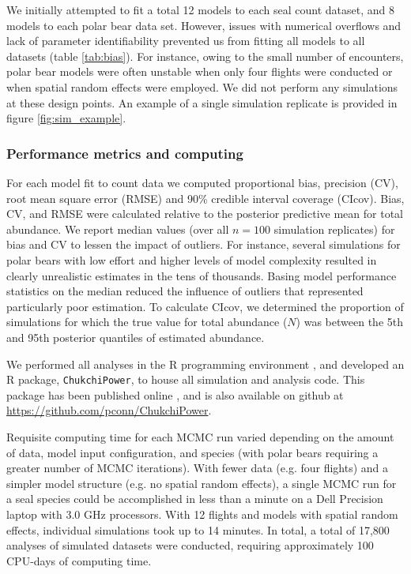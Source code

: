\documentclass[]{rsos}%
\begin{document}
We initially attempted to fit a total 12 models to each seal count dataset, and 8 models to each polar bear data set. However, issues with numerical overflows and lack of parameter identifiability prevented us from fitting all models to all datasets (table \ref{tab:bias}). For instance, owing to the small number of encounters, polar bear models were often unstable when only four flights were conducted or when spatial random effects were employed.  We did not perform any simulations at these design points.  An example of a single simulation replicate is provided in figure \ref{fig:sim_example}.

\subsubsection{Performance metrics and computing}

For each model fit to count data we computed proportional bias, precision (CV), root mean square error (RMSE) and 90\% credible interval coverage (CIcov).  Bias, CV, and RMSE were calculated relative to the posterior predictive mean for total abundance.  We report median values (over all $n=100$ simulation replicates) for bias and CV to lessen the impact of outliers.  For instance, several simulations for polar bears with low effort and higher levels of model complexity resulted in clearly unrealistic estimates in the tens of thousands.  Basing model performance statistics on the median reduced the influence of outliers that represented particularly poor estimation. To calculate CIcov, we determined the proportion of simulations for which the true value for total abundance ($N$) was between the 5th and 95th posterior quantiles of estimated abundance.

We performed all analyses in the R programming environment \cite{RTeam2012}, and developed an R package, \texttt{ChukchiPower}, to house all simulation and analysis code. This package has been published online \cite{Conn2015ChukchiPower}, and is also available on github at \url{https://github.com/pconn/ChukchiPower}.

Requisite computing time for each MCMC run varied depending on the amount of data, model input configuration, and species (with polar bears requiring a greater number of MCMC iterations).  With fewer data (e.g. four flights) and a simpler model structure (e.g. no spatial random effects), a single MCMC run for a seal species could be accomplished in less than a minute on a Dell Precision laptop with 3.0 GHz processors.  With 12 flights and models with spatial random effects, individual simulations took up to 14 minutes. In total, a total of 17,800 analyses of simulated datasets were conducted, requiring approximately 100 CPU-days of computing time.
\end{document}
